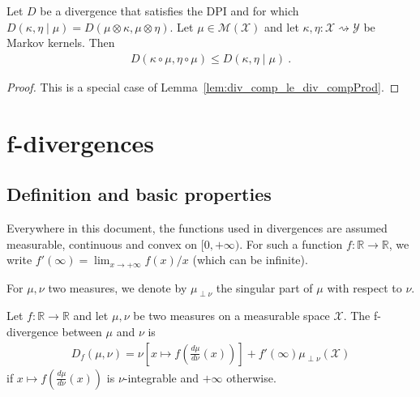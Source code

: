 \begin{lemma}
  \label{lem:div_comp_le_div_compProd_right}
  Let $D$ be a divergence that satisfies the DPI and for which $D(\kappa, \eta \mid \mu) = D(\mu \otimes \kappa, \mu \otimes \eta)$.
  Let $\mathcal \mu \in \mathcal M(\mathcal X)$ and let $\kappa, \eta : \mathcal X \rightsquigarrow \mathcal Y$ be Markov kernels. Then
  \begin{align*}
  D(\kappa \circ \mu, \eta \circ \mu) \le D(\kappa, \eta \mid \mu) \: .
  \end{align*}
\end{lemma}

\begin{proof}%
{}
This is a special case of Lemma~\ref{lem:div_comp_le_div_compProd}.
\end{proof}

\section{f-divergences}

\subsection{Definition and basic properties}

Everywhere in this document, the functions used in divergences are assumed measurable, continuous and convex on $[0, +\infty)$.
For such a function $f : \mathbb{R} \to \mathbb{R}$, we write $f'(\infty) = \lim_{x \to +\infty} f(x)/x$ (which can be infinite).

For $\mu, \nu$ two measures, we denote by $\mu_{\perp \nu}$ the singular part of $\mu$ with respect to $\nu$.

\begin{definition}[f-divergence]
  \label{def:fDiv}
  \leanok
  Let $f : \mathbb{R} \to \mathbb{R}$ and let $\mu, \nu$ be two measures on a measurable space $\mathcal X$. The f-divergence between $\mu$ and $\nu$ is
  \begin{align*}
  D_f(\mu, \nu) = \nu\left[x \mapsto f\left(\frac{d \mu}{d \nu}(x)\right)\right] + f'(\infty) \mu_{\perp \nu}(\mathcal X)
  \end{align*}
  if $x \mapsto f\left(\frac{d \mu}{d \nu}(x)\right)$ is $\nu$-integrable and $+\infty$ otherwise.
\end{definition}


